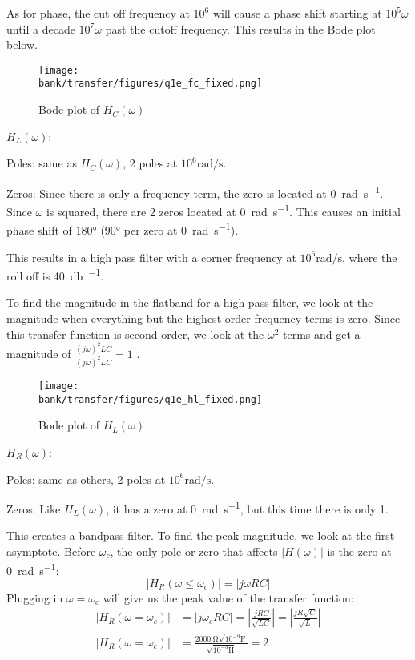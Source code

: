 \begin{enumerate}
{%

As for phase, the cut off frequency at $10^6$ will cause a phase shift starting at $10^5 \omega$  until a decade $10^7 \omega$ past the cutoff frequency. This results in the Bode plot below.


    \begin{figure}[H]\centering
  \texttt{[image: \\bank/transfer/figures/q1e\_fc\_fixed.png]}
  \caption{Bode plot of $H_C(\omega)$}
  \end{figure}

$H_L(\omega)$:

Poles: same as $H_C(\omega)$, 2 poles at $10^6 \si{\radian\per\second}$.

Zeros: Since there is only a frequency term, the zero is located at \SI{0}{\radian\per\second}. Since $\omega$ is squared, there are 2 zeros located at \SI{0}{\radian\per\second}. This causes an initial phase shift of $\ang{180}$ ($\ang{90}$ per zero at \SI{0}{\radian\per\second}).

This results in a high pass filter with a corner frequency at $10^6 \si{\radian\per\second}$, where the roll off is \SI{40}{\decibel\per\decade}.

To find the magnitude in the flatband for a high pass filter, we look at the magnitude when everything but the highest order frequency terms is zero. Since this transfer function is second order, we look at the $\omega^2$ terms and get a magnitude of $\frac{(j\omega)^2LC}{(j\omega)^2LC} = 1$
.
  \begin{figure}[H]\centering
  \texttt{[image: \\bank/transfer/figures/q1e\_hl\_fixed.png]}
  \caption{Bode plot of $H_L(\omega)$}
  \end{figure}
  
$H_R(\omega)$:

Poles: same as others, 2 poles at $10^6 \si{\radian\per\second}$.

Zeros: Like $H_L(\omega)$, it has a zero at \SI{0}{\radian\per\second}, but this time there is only 1.

This creates a bandpass filter. To find the peak magnitude, we look at the first asymptote. Before $\omega_c$, the only pole or zero that affects $|H(\omega)|$ is the zero at \SI{0}{\radian\per\second}:
\[|H_{R}(\omega \leq \omega_c)|= |j\omega RC|\]
Plugging in $\omega=\omega_c$ will give us the peak value of the transfer function:
\begin{align*}
|H_{R}(\omega = \omega_c)|&= |j\omega_c RC|=\left|\frac{jRC}{\sqrt{LC}}\right| = \left|\frac{jR\sqrt{C}}{\sqrt{L}}\right| \\
 |H_{R}(\omega = \omega_c)|&= \frac{\SI{2000}{\ohm}\sqrt{10^{-9}\si{\farad}}}{\sqrt{10^{-3}\si{\henry}}} = 2
\end{align*}

}
\end{enumerate}
